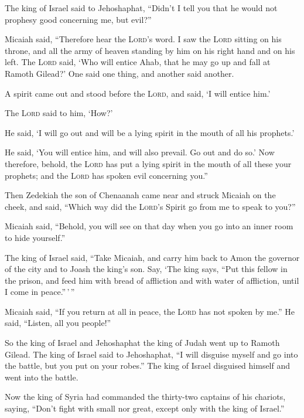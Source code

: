  The king of Israel said to Jehoshaphat, ``Didn't I tell
you that he would not prophesy good concerning me, but evil?''

 Micaiah said, ``Therefore hear the \textsc{Lord}'s word.
I saw the \textsc{Lord} sitting on his throne, and all the army of
heaven standing by him on his right hand and on his left.
 The \textsc{Lord} said, `Who will entice Ahab, that he
may go up and fall at Ramoth Gilead?' One said one thing, and another
said another.

 A spirit came out and stood before the \textsc{Lord},
and said, `I will entice him.'

 The \textsc{Lord} said to him, `How?'

He said, `I will go out and will be a lying spirit in the mouth of all
his prophets.'

He said, `You will entice him, and will also prevail. Go out and do so.'
 Now therefore, behold, the \textsc{Lord} has put a lying
spirit in the mouth of all these your prophets; and the \textsc{Lord}
has spoken evil concerning you.''

 Then Zedekiah the son of Chenaanah came near and struck
Micaiah on the cheek, and said, ``Which way did the \textsc{Lord}'s
Spirit go from me to speak to you?''

 Micaiah said, ``Behold, you will see on that day when
you go into an inner room to hide yourself.''

 The king of Israel said, ``Take Micaiah, and carry him
back to Amon the governor of the city and to Joash the king's son.
 Say, `The king says, ``Put this fellow in the prison,
and feed him with bread of affliction and with water of affliction,
until I come in peace.''\,'\,''

 Micaiah said, ``If you return at all in peace, the
\textsc{Lord} has not spoken by me.'' He said, ``Listen, all you
people!''

 So the king of Israel and Jehoshaphat the king of Judah
went up to Ramoth Gilead.  The king of Israel said to
Jehoshaphat, ``I will disguise myself and go into the battle, but you
put on your robes.'' The king of Israel disguised himself and went into
the battle.

 Now the king of Syria had commanded the thirty-two
captains of his chariots, saying, ``Don't fight with small nor great,
except only with the king of Israel.''

